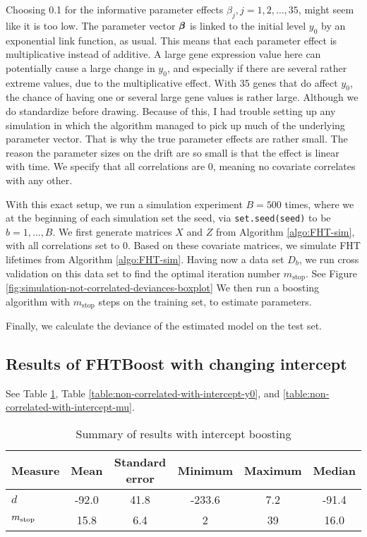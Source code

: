 Choosing 0.1 for the informative parameter effects $\beta_j,j=1,2,\ldots,35$, might seem like it is too low.
The parameter vector $\boldsymbol{\beta}$ is linked to the initial level $y_0$ by an exponential link function, as usual.
This means that each parameter effect is multiplicative instead of additive.
A large gene expression value here can potentially cause a large change in $y_0$, and especially if there are several rather extreme values, due to the multiplicative effect.
With 35 genes that do affect $y_0$, the chance of having one or several large gene values is rather large.
Although we do standardize before drawing.
Because of this, I had trouble setting up any simulation in which the algorithm managed to pick up much of the underlying parameter vector.
That is why the true parameter effects are rather small.
The reason the parameter sizes on the drift are so small is that the effect is linear with time.
We specify that all correlations are 0, meaning no covariate correlates with any other.

With this exact setup, we run a simulation experiment $B=500$ times, where we at the beginning of each simulation set the seed, via \verb|set.seed(seed)| to be $b=1,\ldots,B$.
We first generate matrices $X$ and $Z$ from Algorithm \ref{algo:FHT-sim}, with all correlations set to 0.
Based on these covariate matrices, we simulate FHT lifetimes from Algorithm \ref{algo:FHT-sim}.
Having now a data set $D_b$, we run cross validation on this data set to find the optimal iteration number $m_{\text{stop}}$.
See Figure \ref{fig:simulation-not-correlated-deviances-boxplot}
We then run a boosting algorithm with $m_{\text{stop}}$ steps on the training set, to estimate parameters.


Finally, we calculate the deviance of the estimated model on the test set.

\subsection{Results of FHTBoost with changing intercept}
See Table \ref{table:non-correlated-with-intercept-summary}, Table \ref{table:non-correlated-with-intercept-y0}, and \ref{table:non-correlated-with-intercept-mu}.


\begin{table}\caption{Summary of results with intercept boosting}\label{table:non-correlated-with-intercept-summary}
\centering
\begin{tabular}{lccccc}
\toprule
Measure &   Mean & Standard error &  Minimum &    Maximum & Median \\
\hline
$d$    &    -92.0 & 41.8 &  -233.6   &  7.2 &  -91.4 \\
$m_{\text{stop}}$      &    15.8 &  6.4 &     2 &    39 & 16.0\\
\bottomrule
\end{tabular}
\end{table}

